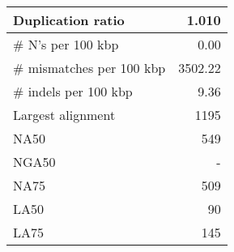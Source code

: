\documentclass[12pt,a4paper]{article}
\begin{document}
\begin{table}[ht]
\begin{center}
\begin{tabular}{|l*{1}{|r}|}
Duplication ratio & 1.010 \\ \hline
\# N's per 100 kbp & 0.00 \\ \hline
\# mismatches per 100 kbp & 3502.22 \\ \hline
\# indels per 100 kbp & 9.36 \\ \hline
Largest alignment & 1195 \\ \hline
NA50 & 549 \\ \hline
NGA50 & - \\ \hline
NA75 & 509 \\ \hline
LA50 & 90 \\ \hline
LA75 & 145 \\ \hline
\end{tabular}
\end{center}
\end{table}
\end{document}
